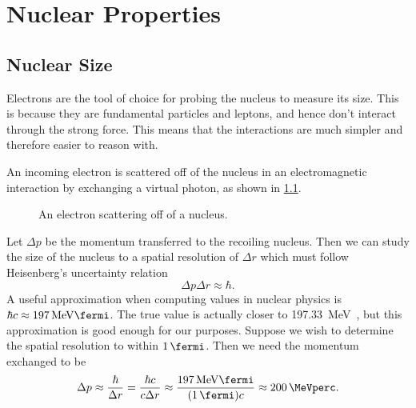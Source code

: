 \documentclass[fleqn]{NotesClass}
\begin{document}
    \chapter{Nuclear Properties}
    \section{Nuclear Size}
    Electrons are the tool of choice for probing the nucleus to measure its size.
    This is because they are fundamental particles and leptons, and hence don't interact through the strong force.
    This means that the interactions are much simpler and therefore easier to reason with.
    
    An incoming electron is scattered off of the nucleus in an electromagnetic interaction by exchanging a virtual photon, as shown in \cref{fig:electron nucleus scattering}.
    
    \begin{figure}
    \caption{An electron scattering off of a nucleus.}
    \label{fig:electron nucleus scattering}
    \end{figure}

    Let \(\Delta p\) be the momentum transferred to the recoiling nucleus.
    Then we can study the size of the nucleus to a spatial resolution of \(\Delta r\) which must follow Heisenberg's uncertainty relation
    \begin{equation}
        \Delta p \Delta r \approx \hbar.
    \end{equation}
    A useful approximation when computing values in nuclear physics is \(\hbar c \approx \qty{197}{\MeV\fermi}\).
    The true value is actually closer to \qty{197.33}{\MeV\fermi}, but this approximation is good enough for our purposes.
    Suppose we wish to determine the spatial resolution to within \(\qty{1}{\fermi}\).
    Then we need the momentum exchanged to be
    \begin{equation}
        \Delta p \approx \frac{\hbar}{\Delta r} = \frac{\hbar c}{c\Delta r} \approx \frac{\qty{197}{\MeV\fermi}}{(\qty{1}{\fermi}) c} \approx \qty{200}{\MeVperc}.
    \end{equation}
    
\end{document}
